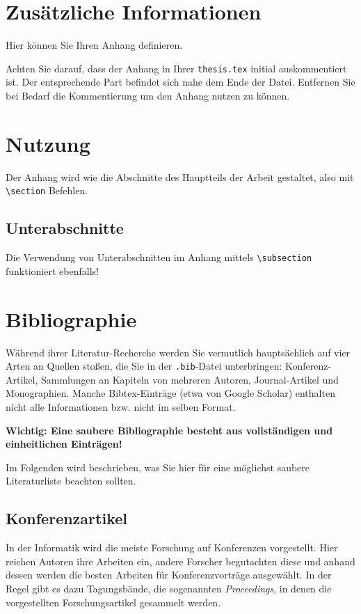 \section{Zusätzliche Informationen}

Hier können Sie Ihren Anhang definieren.

Achten Sie darauf, dass der Anhang in Ihrer \texttt{thesis.tex}
initial auskommentiert ist.
Der entsprechende Part befindet sich nahe dem Ende der Datei.
Entfernen Sie bei Bedarf die Kommentierung um den Anhang nutzen zu können.


\section{Nutzung}

Der Anhang wird wie die Abschnitte des Hauptteils der Arbeit gestaltet,
also mit \texttt{\textbackslash section} Befehlen.

  \subsection{Unterabschnitte}
  Die Verwendung von Unterabschnitten im Anhang
  mittels \texttt{\textbackslash subsection}
  funktioniert ebenfalls!

\section{Bibliographie}%
\label{app:sec:bib}

Während ihrer Literatur-Recherche werden Sie vermutlich hauptsächlich auf vier Arten
an Quellen stoßen, die Sie in der \verb|.bib|-Datei unterbringen:
Konferenz-Artikel, Sammlungen an Kapiteln von mehreren Autoren, Journal-Artikel und Monographien.
Manche Bibtex-Einträge (etwa von Google Scholar) enthalten nicht alle Informationen
bzw. nicht im selben Format.

\textbf{Wichtig: Eine saubere Bibliographie besteht aus vollständigen und einheitlichen Einträgen!}

Im Folgenden wird beschrieben, was Sie hier für eine möglichst saubere Literaturliste beachten sollten.

\subsection{Konferenzartikel}

In der Informatik wird die meiste Forschung auf Konferenzen vorgestellt.
Hier reichen Autoren ihre Arbeiten ein, andere Forscher begutachten diese
und anhand dessen werden die besten Arbeiten für Konferenzvorträge ausgewählt.
In der Regel gibt es dazu Tagungsbände, die sogenannten \emph{Proceedings},
in denen die vorgestellten Forschungsartikel gesammelt werden.

